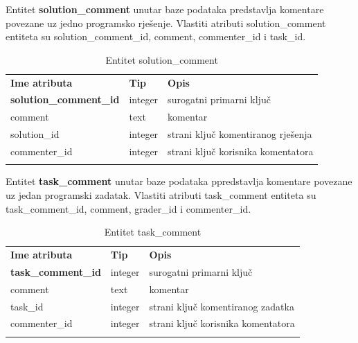 \documentclass[times, utf8, zavrsni]{fer}
\begin{document}
		Entitet \textbf{solution\_comment} unutar baze podataka predstavlja komentare povezane uz jedno programsko rješenje. Vlastiti atributi solution\_comment entiteta su solution\_comment\_id, comment, commenter\_id i task\_id. 
		\begin{table}[H]
			\caption{Entitet solution\_comment}
			\label{tbl:solutioncomment}
			\centering
			\begin{tabu} to \textwidth {XXX}
				\tabucline[1.75pt]{-}
				\textbf{Ime atributa} & \textbf{Tip} & \textbf{Opis}\\ 				
				\tabucline[1.75pt]{-}
				\textbf{solution\_comment\_id} & integer & surogatni primarni ključ\\ \hline
				comment & text & komentar\\ \hline
				solution\_id & integer & strani ključ komentiranog rješenja\\ \hline
				commenter\_id & integer & strani ključ korisnika komentatora\\ \hline
				\tabucline[1.75pt]{-}
			\end{tabu}
		\end{table}
	
		Entitet \textbf{task\_comment} unutar baze podataka ppredstavlja komentare povezane uz jedan programski zadatak. Vlastiti atributi task\_comment entiteta su task\_comment\_id, comment, grader\_id i commenter\_id. 
		\begin{table}[H]
			\caption{Entitet task\_comment}
			\label{tbl:taskcomment}
			\centering
			\begin{tabu} to \textwidth {XXX}
				\tabucline[1.75pt]{-}
				\textbf{Ime atributa} & \textbf{Tip} & \textbf{Opis}\\ 				
				\tabucline[1.75pt]{-}
				\textbf{task\_comment\_id} & integer & surogatni primarni ključ\\ \hline
				comment & text & komentar\\ \hline
				task\_id & integer & strani ključ komentiranog zadatka\\ \hline
				commenter\_id & integer & strani ključ korisnika komentatora\\ \hline
				\tabucline[1.75pt]{-}
			\end{tabu}
		\end{table}
	
\end{document}
